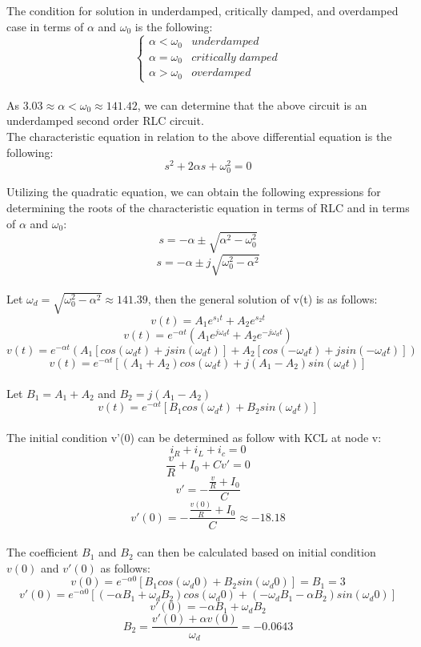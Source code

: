 \documentclass{article}
\begin{document}
The condition for solution in underdamped, critically damped, and overdamped case in terms of $\alpha$ and $\omega_0$ is the following:
\[ \begin{cases} 
      \alpha < \omega_0 & underdamped \\
      \alpha = \omega_0 & critically\; damped \\
      \alpha > \omega_0 & overdamped 
   \end{cases}
\]\\

As $3.03\approx\alpha < \omega_0\approx141.42$, we can determine that the above circuit is an underdamped second order RLC circuit.\\

The characteristic equation in relation to the above differential equation is the following:
$$s^2+2\alpha s+\omega_0^2=0$$

Utilizing the quadratic equation, we can obtain the following expressions for determining the roots of the characteristic equation in terms of RLC and in terms of $\alpha$ and $\omega_0$:
$$s=-\alpha \pm\sqrt{\alpha^2-\omega_0^2}$$
$$s=-\alpha \pm j\sqrt{\omega_0^2-\alpha^2}$$\\

Let $\omega_d=\sqrt{\omega_0^2-\alpha^2}\approx 141.39$, then the general solution of v(t) is as follows:
$$v(t)=A_1e^{s_1t}+A_2e^{s_2t}$$
$$v(t)=e^{-\alpha t}(A_1e^{j\omega_dt}+A_2e^{-j\omega_dt})$$
$$v(t)=e^{-\alpha t}(A_1[cos(\omega_dt)+jsin(\omega_dt)]+A_2[cos(-\omega_dt)+jsin(-\omega_dt)])$$
$$v(t)=e^{-\alpha t}[(A_1+A_2)cos(\omega_dt)+j(A_1-A_2)sin(\omega_dt)]$$\\

Let $B_1=A_1+A_2$ and $B_2=j(A_1-A_2)$
$$v(t)=e^{-\alpha t}[B_1cos(\omega_dt)+B_2sin(\omega_dt)]$$\\

The initial condition v'(0) can be determined as follow with KCL at node v:
$$i_R+i_L+i_c=0$$
$$\frac{v}{R}+I_0+Cv'=0$$
$$v'=-\frac{\frac{v}{R}+I_0}{C}$$
$$v'(0)=-\frac{\frac{v(0)}{R}+I_0}{C}\approx -18.18$$\\


The coefficient $B_1$ and $B_2$ can then be calculated based on initial condition $v(0)$ and $v'(0)$ as follows:
$$v(0) =e^{-\alpha 0}[B_1cos(\omega_d0)+B_2sin(\omega_d0)] = B_1=3$$
$$v'(0) =e^{-\alpha 0}[(-\alpha B_1 + \omega_d B_2)cos(\omega_d0)+(-\omega_dB_1-\alpha B_2)sin(\omega_d0)]$$
$$v'(0)=-\alpha B_1 + \omega_d B_2$$
$$ B_2 = \frac{v'(0) + \alpha v(0)}{\omega_d} =-0.0643$$\\
\end{document}
